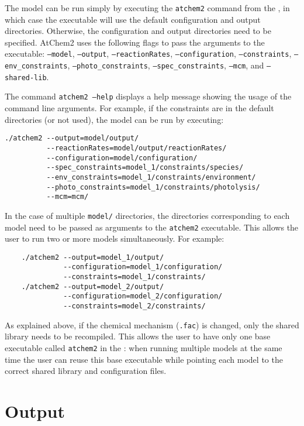The model can be run simply by executing the \texttt{atchem2} command
from the \maindir, in which case the executable will use the default
configuration and output directories. Otherwise, the configuration and
output directories need to be specified. AtChem2 uses the following
flags to pass the arguments to the executable: \texttt{--model},
\texttt{--output}, \texttt{--reactionRates}, \texttt{--configuration},
\texttt{--constraints}, \texttt{--env\_constraints},
\texttt{--photo\_constraints}, \texttt{--spec\_constraints},
\texttt{--mcm}, and \texttt{--shared-lib}.

The command \texttt{atchem2 --help} displays a help message showing
the usage of the command line arguments. For example, if the
constraints are in the default directories (or not used), the model
can be run by executing:

\begin{verbatim}
./atchem2 --output=model/output/
          --reactionRates=model/output/reactionRates/
          --configuration=model/configuration/
          --spec_constraints=model_1/constraints/species/
          --env_constraints=model_1/constraints/environment/
          --photo_constraints=model_1/constraints/photolysis/
          --mcm=mcm/
\end{verbatim}

In the case of multiple \texttt{model/} directories, the directories
corresponding to each model need to be passed as arguments to the
\texttt{atchem2} executable. This allows the user to run two or more
models simultaneously. For example:

\begin{verbatim}
    ./atchem2 --output=model_1/output/
              --configuration=model_1/configuration/
              --constraints=model_1/constraints/
    ./atchem2 --output=model_2/output/
              --configuration=model_2/configuration/
              --constraints=model_2/constraints/
\end{verbatim}

As explained above, if the chemical mechanism (\texttt{.fac}) is
changed, only the shared library needs to be recompiled. This allows
the user to have only one base executable called \texttt{atchem2} in
the \maindir: when running multiple models at the same
time the user can reuse this base executable while pointing each model
to the correct shared library and configuration files.

\section{Output} \label{sec:output}

